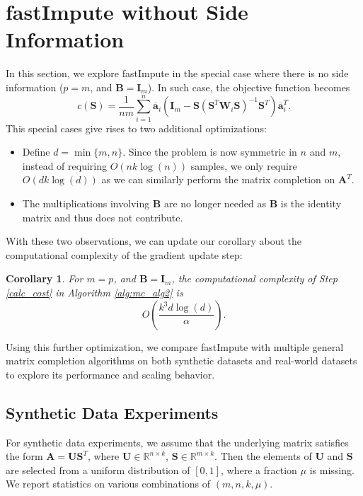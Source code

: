 \documentclass[twoside,11pt]{article}
\newcommand{\md}[1]{\mathbb{#1}}
\newtheorem{cor}{Corollary}
\begin{document}
\section{fastImpute without Side Information}
\label{sec:mc_computegeneral}
In this section, we  explore fastImpute in the special case where there is no side information ($p=m$, and $\bm{B}=\bm{I}_m$). In such case, the objective function becomes
\[c(\bm{S})=\frac{1}{nm}\sum_{i=1}^n  \overline{\bm{a}}_i
	\left(\bm{I}_m-\bm{S}\left(\bm{S}^T\bm{W}_i\bm{S}\right)^{-1}\bm{S}^T\right)\overline{\bm{a}}_i^T.\]
This special cases give rises to two additional optimizations:
\begin{itemize}
    \item Define $d=\min\{m,n\}$. Since the problem is now symmetric in $n$ and $m$, instead of requiring $O(nk\log(n))$ samples, we only require $O(dk\log(d))$ as we can similarly perform the matrix completion on $\bm{A}^T$. 
    \item The multiplications involving $\bm{B}$ are no longer needed as $\bm{B}$ is the identity matrix and thus does not contribute. 
\end{itemize}
With these two observations, we can update our corollary  about the computational complexity of the gradient update step:
\begin{cor}
For $m=p$, and $\bm{B}=\bm{I}_m$, the computational complexity of Step \ref{calc_cost} in Algorithm \ref{alg:mc_alg2} is $$O\left(\frac{k^3d\log (d)}{\alpha}\right).$$
\end{cor}
Using this further optimization, we compare fastImpute with multiple general matrix completion algorithms on both synthetic datasets and real-world datasets to explore its performance and scaling behavior.
\subsection{Synthetic Data Experiments}
 For synthetic data experiments, we assume that the underlying matrix satisfies the form $\bm{A}=\bm{U}\bm{S}^T$, where $\bm{U} \in \md{R}^{n \times k}$, $\bm{S} \in \md{R}^{m\times k}$. Then the elements of $\bm{U}$ and $\bm{S}$ are selected from a uniform distribution of $[0,1]$, where a fraction  $\mu$ is missing. We report statistics on various combinations of $(m,n,k,\mu)$.
 
\end{document}

